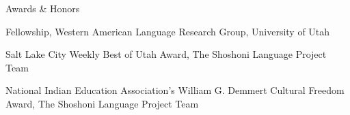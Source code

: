 \begin{rubric}{Awards \& Honors}

    \entry*[2013, 2014][\faCertificate]%
    
    Fellowship, Western American Language Research Group, University of Utah
    
    \entry*[2013][\faCertificate]%
        Salt Lake City Weekly Best of Utah Award, The Shoshoni Language Project Team
        
    \entry*[2013][\faCertificate]%
        National Indian Education Association's William G. Demmert Cultural Freedom Award, The Shoshoni Language Project Team
        
        
        \end{rubric}